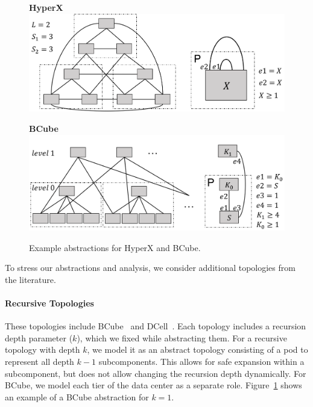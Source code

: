 \documentclass[numbers, 10pt, preprint]{sigplanconf}
\newcommand{\para}[1]{\paragraph*{\textbf{#1}}}
\newcommand{\hdr}[2]{\flushleft \chdr{\hspace{5mm}#1}{#2}}
\newcommand{\chdr}[2]{\textbf{#1} {#2} \\ \centering}%
\begin{document}
\begin{figure}[t!]
  \begin{minipage}[t]{\linewidth}
    \hdr{HyperX}{}
    \vspace{.6em}
    \includegraphics[width=\linewidth]{figures/hyperx}
  \end{minipage}%

  \vspace{1em}
  \begin{minipage}[t]{\linewidth}
    \hdr{BCube}{}
    \vspace{.1em}
    \includegraphics[width=\linewidth]{figures/bcube}
  \end{minipage}%


  \caption{Example abstractions for HyperX and BCube.}
  \label{fig:example-abstractions}
  \vspace{-.8em}%
\end{figure}

To stress our abstractions and analysis, we consider additional topologies from the literature.

\para{Recursive Topologies}
These topologies include BCube~\cite{bcube} and DCell~\cite{dcell}. Each topology includes a recursion depth parameter ($k$), which we fixed while abstracting them. For a recursive topology with depth $k$, we model it as an abstract topology consisting of a pod to represent all depth $k-1$ subcomponents. This allows for safe expansion within a subcomponent, but does not allow changing the recursion depth dynamically.
For BCube, we model each tier of the data center as a separate role. Figure~\ref{fig:example-abstractions} shows an example of a BCube abstraction for $k=1$.
\end{document}
